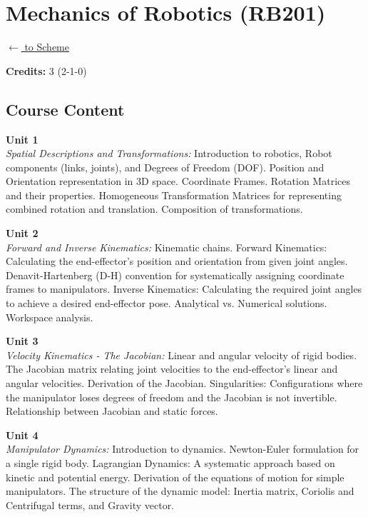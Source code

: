 \section*{Mechanics of Robotics (RB201)}
\label{major:RB_1}

\noindent \small{\hyperref[main:scheme]{$\leftarrow$ to Scheme}} \vspace{0.5cm}

\noindent \textbf{Credits:} 3 (2-1-0)

\subsection*{Course Content}
\noindent\textbf{Unit 1} \\
\textit{Spatial Descriptions and Transformations:} Introduction to robotics, Robot components (links, joints), and Degrees of Freedom (DOF). Position and Orientation representation in 3D space. Coordinate Frames. Rotation Matrices and their properties. Homogeneous Transformation Matrices for representing combined rotation and translation. Composition of transformations.

\vspace{0.3cm}

\noindent\textbf{Unit 2} \\
\textit{Forward and Inverse Kinematics:} Kinematic chains. Forward Kinematics: Calculating the end-effector's position and orientation from given joint angles. Denavit-Hartenberg (D-H) convention for systematically assigning coordinate frames to manipulators. Inverse Kinematics: Calculating the required joint angles to achieve a desired end-effector pose. Analytical vs. Numerical solutions. Workspace analysis.

\vspace{0.3cm}

\noindent\textbf{Unit 3} \\
\textit{Velocity Kinematics - The Jacobian:} Linear and angular velocity of rigid bodies. The Jacobian matrix relating joint velocities to the end-effector's linear and angular velocities. Derivation of the Jacobian. Singularities: Configurations where the manipulator loses degrees of freedom and the Jacobian is not invertible. Relationship between Jacobian and static forces.

\vspace{0.3cm}

\noindent\textbf{Unit 4} \\
\textit{Manipulator Dynamics:} Introduction to dynamics. Newton-Euler formulation for a single rigid body. Lagrangian Dynamics: A systematic approach based on kinetic and potential energy. Derivation of the equations of motion for simple manipulators. The structure of the dynamic model: Inertia matrix, Coriolis and Centrifugal terms, and Gravity vector.

